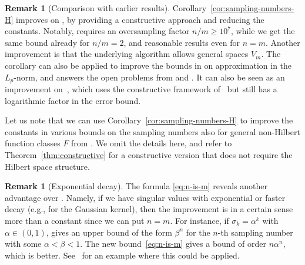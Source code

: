 \documentclass[a4paper,11pt]{article}
\renewcommand{\(}{\left (}
\renewcommand{\)}{\right )}
\newcommand{\<}{\langle}
\renewcommand{\>}{\rangle}
\theoremstyle{definition}
\newtheorem{remark}[theorem]{Remark}
\begin{document}
\begin{remark}[Comparison with earlier results]
Corollary~\ref{cor:sampling-numbers-H} improves on \cite[Theorem~23]{DKU}, 
by providing a constructive approach and reducing the constants.
Notably, \cite{DKU} requires an oversampling factor $n/m \geq 10^7$,
while we get the same bound already for $n/m=2$,
and reasonable results even for $n=m$.
Another improvement is that the underlying algorithm allows general spaces $V_m$. 
The corollary can also be applied to improve the bounds in \cite{KPUU}
on approximation in the $L_p$-norm, 
and answers the open problems from \cite[Remark~21]{DKU} and \cite[Remark~2]{KPUU}. 
It can also be seen as an improvement on~\cite{BSU}, 
which uses the constructive framework of~\cite{BSS} 
but still has a logarithmic factor in the error bound.
\end{remark}

Let us note that we can use Corollary~\ref{cor:sampling-numbers-H}
to improve the constants in various bounds on the sampling numbers
also for general non-Hilbert function classes $F$
from \cite{DKU,KPUU,KU2}.
We omit the details here, and refer to
Theorem~\ref{thm:constructive}
for a constructive version 
that does not require the Hilbert space structure.

\smallskip

\begin{remark}[Exponential decay]
The formula \eqref{eq:n-is-m} reveals another advantage over \cite[Theorem~23]{DKU}. 
Namely, if we have singular values with exponential or faster decay (e.g., for the Gaussian kernel), then the improvement is in a certain sense more than a constant since we can put $n=m$. 
For instance, if $\sigma_k=\alpha^k$ with $\alpha \in (0,1)$, 
\cite{DKU} gives an upper bound of the form $\beta^n$ for the $n$-th sampling number with some $\alpha<\beta<1$. 
The new bound~\eqref{eq:n-is-m} gives a bound of order $n\alpha^n$, which is better. See~\cite{KarvonenSuzuki}
for an example where this could be applied.
\end{remark}

\smallskip
\end{document}
